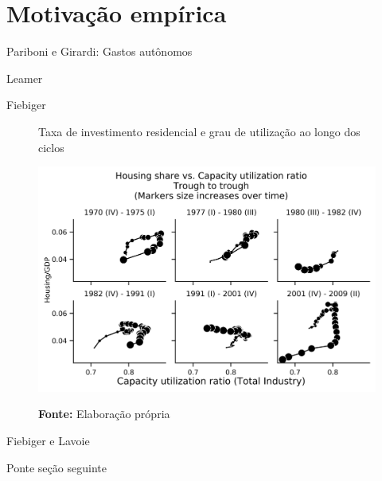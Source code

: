 \section{Motivação empírica}

Pariboni e Girardi: Gastos autônomos

Leamer

Fiebiger

\begin{figure}[htb]
    \centering
        \caption{Taxa de investimento residencial e grau de utilização ao longo dos ciclos}
    \includegraphics[width = \textwidth]{AKB/Empiria_AKB.png}
    \label{Investo_Resid}
    \caption*{\textbf{Fonte:} Elaboração própria}
\end{figure}

Fiebiger e Lavoie

Ponte seção seguinte